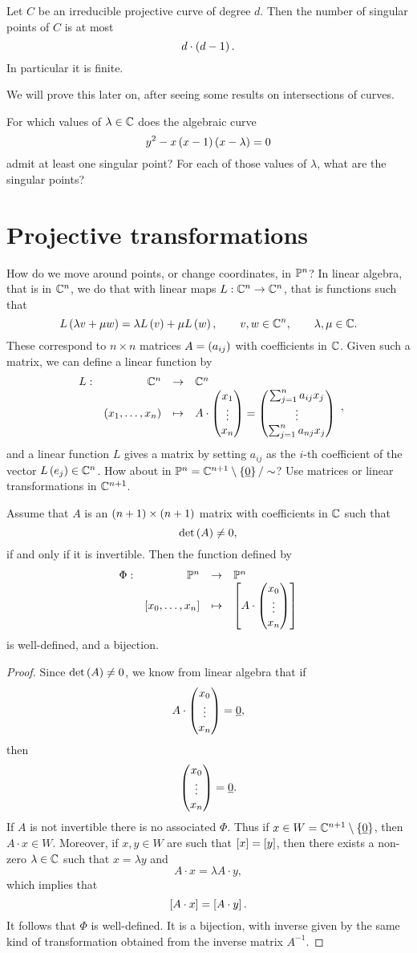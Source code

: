 \begin{theorem}
\label{thm:7.11}
Let $ C $ be an irreducible projective curve of degree $ d $. Then the number of singular points of $ C $ is at most
$$ d \cdot \rb{d - 1}. $$
In particular it is finite.
\end{theorem}

We will prove this later on, after seeing some results on intersections of curves.

\begin{exercise}
For which values of $ \lambda \in \C $ does the algebraic curve
$$ y^2 - x\rb{x - 1}\rb{x - \lambda} = 0 $$
admit at least one singular point? For each of those values of $ \lambda $, what are the singular points?
\end{exercise}

\pagebreak

\section{Projective transformations}

How do we move around points, or change coordinates, in $ \P^n $? In linear algebra, that is in $ \C^n $, we do that with linear maps $ L : \C^n \to \C^n $, that is functions such that
$$ L\rb{\lambda v + \mu w} = \lambda L\rb{v} + \mu L\rb{w}, \qquad v, w \in \C^n, \qquad \lambda, \mu \in \C. $$
These correspond to $ n \times n $ matrices $ A = \rb{a_{ij}} $ with coefficients in $ \C $. Given such a matrix, we can define a linear function by
$$ \function[L]{\C^n}{\C^n}{\rb{x_1, \dots, x_n}}{A \cdot \threebyone{x_1}{\vdots}{x_n} = \threebyone{\sum_{j = 1}^n a_{ij}x_j}{\vdots}{\sum_{j = 1}^n a_{nj}x_j}}, $$
and a linear function $ L $ gives a matrix by setting $ a_{ij} $ as the $ i $-th coefficient of the vector $ L\rb{e_j} \in \C^n $. How about in $ \P^n = \C^{n + 1} \setminus \cb{\underline{0}} / \sim $? Use matrices or linear transformations in $ \C^{n + 1} $.

\begin{lemma}
\label{lem:8.1}
Assume that $ A $ is an $ \rb{n + 1} \times \rb{n + 1} $ matrix with coefficients in $ \C $ such that
$$ \det\rb{A} \ne 0, $$
if and only if it is invertible. Then the function defined by
$$ \function[\Phi]{\P^n}{\P^n}{\sb{x_0, \dots, x_n}}{\sb{A \cdot \threebyone{x_0}{\vdots}{x_n}}} $$
is well-defined, and a bijection.
\end{lemma}

\begin{proof}
Since $ \det\rb{A} \ne 0 $, we know from linear algebra that if
$$ A \cdot \threebyone{x_0}{\vdots}{x_n} = \underline{0}, $$
then
$$ \threebyone{x_0}{\vdots}{x_n} = \underline{0}. $$
If $ A $ is not invertible there is no associated $ \Phi $. Thus if $ x \in W = \C^{n + 1} \setminus \cb{\underline{0}} $, then $ A \cdot x \in W $. Moreover, if $ x, y \in W $ are such that $ \sb{x} = \sb{y} $, then there exists a non-zero $ \lambda \in \C $ such that $ x = \lambda y $ and
$$ A \cdot x = \lambda A \cdot y, $$
which implies that
$$ \sb{A \cdot x} = \sb{A \cdot y}. $$
It follows that $ \Phi $ is well-defined. It is a bijection, with inverse given by the same kind of transformation obtained from the inverse matrix $ A^{-1} $.
\end{proof}

